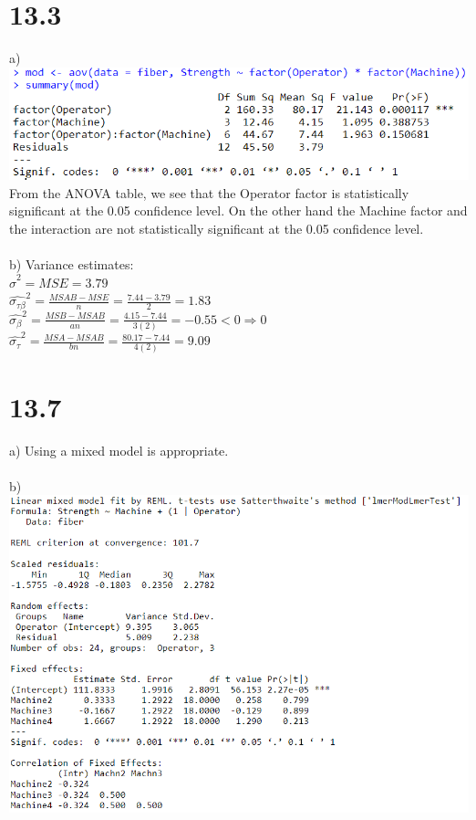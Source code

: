 \documentclass{article}
\begin{document}
\section*{13.3}
a) \includegraphics{13.3a.PNG}
\\From the ANOVA table, we see that the Operator factor is statistically significant at the 0.05 confidence level. On the other hand the Machine factor and the interaction are not statistically significant at the 0.05 confidence level.
\\
\\b) Variance estimates:
\\$\hat{\sigma}^2 = MSE = 3.79$
\\$\hat{\sigma_{\tau\beta}}^2 = \frac{MSAB - MSE}{n} = \frac{7.44 - 3.79}{2} = 1.83$
\\$\hat{\sigma_{\beta}}^2 = \frac{MSB - MSAB}{an} = \frac{4.15 - 7.44}{3(2)} = -0.55 < 0 \Rightarrow 0$
\\$\hat{\sigma_{\tau}}^2 = \frac{MSA - MSAB}{bn} = \frac{80.17 - 7.44}{4(2)} = 9.09$

\section*{13.7}
a) Using a mixed model is appropriate.
\\
\\b) \includegraphics{13.7.PNG}
\end{document}
